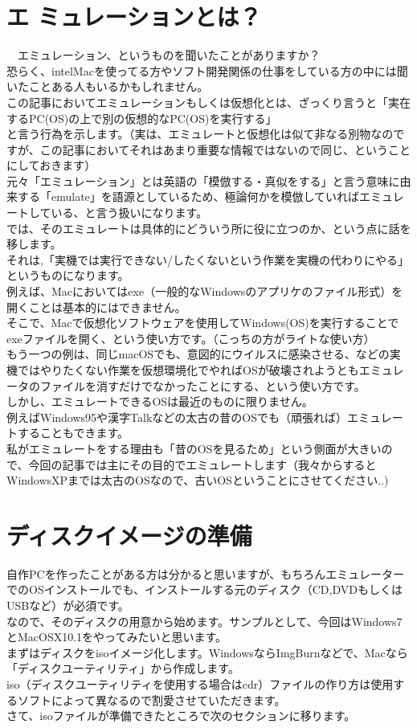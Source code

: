 \documentclass[b5paper,9pt,platex,dvipdfmx]{jsarticle}
\begin{document}
\begin{multicols*}{3}
\section{エ
ミュレーションとは？}
　エミュレーション、というものを聞いたことがありますか？\\
恐らく、intelMacを使ってる方やソフト開発関係の仕事をしている方の中には聞いたことある人もいるかもしれません。\\
この記事においてエミュレーションもしくは仮想化とは、ざっくり言うと「実在するPC(OS)の上で別の仮想的なPC(OS)を実行する」\\
と言う行為を示します。（実は、エミュレートと仮想化は似て非なる別物なのですが、この記事においてそれはあまり重要な情報ではないので同じ、ということにしておきます）\\
元々「エミュレーション」とは英語の「模倣する・真似をする」と言う意味に由来する「emulate」を語源としているため、極論何かを模倣していればエミュレートしている、と言う扱いになります。\\
では、そのエミュレートは具体的にどういう所に役に立つのか、という点に話を移します。\\
それは,「実機では実行できない/したくないという作業を実機の代わりにやる」というものになります。\\
例えば、Macにおいてはexe（一般的なWindowsのアプリケのファイル形式）を開くことは基本的にはできません。\\
そこで、Macで仮想化ソフトウェアを使用してWindows(OS)を実行することでexeファイルを開く、という使い方です。（こっちの方がライトな使い方）\\
もう一つの例は、同じmacOSでも、意図的にウイルスに感染させる、などの実機ではやりたくない作業を仮想環境化でやればOSが破壊されようともエミュレータのファイルを消すだけでなかったことにする、という使い方です。\\
しかし、エミュレートできるOSは最近のものに限りません。\\
例えばWindows95や漢字Talkなどの太古の昔のOSでも（頑張れば）エミュレートすることもできます。\\
私がエミュレートをする理由も「昔のOSを見るため」という側面が大きいので、今回の記事では主にその目的でエミュレートします（我々からするとWindowsXPまでは太古のOSなので、古いOSということにさせてください..)\\
\section{ディスクイメージの準備}
自作PCを作ったことがある方は分かると思いますが、もちろんエミュレーターでのOSインストールでも、インストールする元のディスク（CD,DVDもしくはUSBなど）が必須です。\\
なので、そのディスクの用意から始めます。サンプルとして、今回はWindows7とMacOSX10.1をやってみたいと思います。\\
まずはディスクをisoイメージ化します。WindowsならImgBurnなどで、Macなら「ディスクユーティリティ」から作成します。\\
iso（ディスクユーティリティを使用する場合はcdr）ファイルの作り方は使用するソフトによって異なるので割愛させていただきます。\\
さて、isoファイルが準備できたところで次のセクションに移ります。\\

\end{multicols*}
\end{document}
